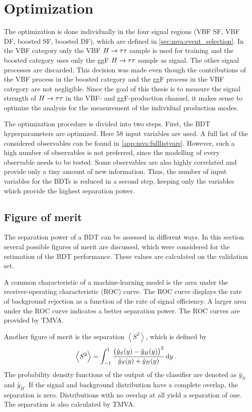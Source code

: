 \section{Optimization}\label{sec:mva:optimization}

The optimization is done individually in the four signal regions (VBF SF, VBF DF, boosted SF, boosted DF), which are defined in \cref{sec:mva:event_selection}.
In the VBF category only the VBF $H \to \tau \tau$ sample is used for training and the boosted category uses only the ggF $H \to \tau \tau$ sample as signal.
The other signal processes are discarded.
This decision was made even though the contributions of the VBF process in the boosted category and
the ggF process in the VBF category are not negligible.
Since the goal of this thesis is to measure the signal strength of $H \to \tau \tau$ in the VBF- and ggF-production channel,
it makes sense to optimize the analysis for the measurement of the individual production modes.

The optimization procedure is divided into two steps.
First, the BDT hyperparameters are optimized. Here $58$ input variables are used. A full list of the considered observables can be found in \cref{app:mva:fulllistvars}.
However, such a high number of observables is not preferred, since the modelling of every observable needs to be tested.
Some observables are also highly correlated and provide only a tiny amount of new information.
Thus, the number of input variables for the BDTs is reduced in a second step, keeping only the variables which provide
the highest separation power.

\subsection{Figure of merit}\label{sub:mva:optimization:fom}

The separation power of a BDT can be assessed in different ways.
In this section several possible figures of merit are discussed,
which were considered for the estimation of the BDT performance.
These values are calculated on the validation set.

A common characteristic of a machine-learning model is the area under the receiver-operating characteristic (ROC) curve.
The ROC curve displays the rate of background rejection as a function of the rate of signal efficiency.
A larger area under the ROC curve indicates a better separation power.
The ROC curves are provided by TMVA\@.

Another figure of merit is the separation $\left<S^2\right>$, which is defined by~\cite{TMVA}
\begin{equation}
    \left<S^2\right> = \int_{-1}^1 \frac{{\left(\hat{y}_S(y) - \hat{y}_B(y)\right)}^2}{\hat{y}_S(y) + \hat{y}_B(y)} \dif y \,.
\end{equation}
The probability density functions of the output of the classifier are denoted as $\hat{y}_S$ and $\hat{y}_B$.
If the signal and background distribution have a complete overlap, the separation is zero.
Distributions with no overlap at all yield a separation of one.
The separation is also calculated by TMVA\@.

